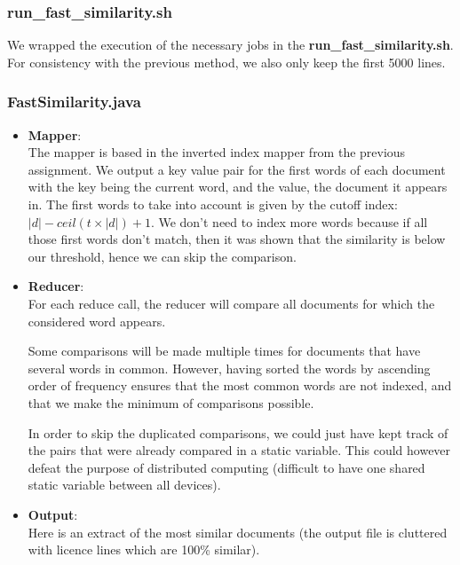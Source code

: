\documentclass[a4paper,10pt]{article}
\begin{document}
\subsubsection{run\_fast\_similarity.sh}
We wrapped the execution of the necessary jobs in the \textbf{run\_fast\_similarity.sh}.
For consistency with the previous method, we also only keep the first 5000 lines.


\subsubsection{FastSimilarity.java}
\begin{itemize}
  \item \textbf{Mapper}:\\
  The mapper is based in the inverted index mapper from the previous assignment.
  We output a key value pair for the first words of each document with the key being
  the current word, and the value, the document it appears in.
  The first words to take into account is given by the cutoff index: $|d| - ceil(t \times |d|) + 1$.
  We don't need to index more words because if all those first words don't match,
  then it was shown that the similarity is below our threshold, hence we can skip
  the comparison.
  

  \item \textbf{Reducer}:\\
  For each reduce call, the reducer will compare all documents for which the considered
  word appears.

  Some comparisons will be made multiple times for documents that have several words
  in common.
  However, having sorted the words by ascending order of frequency ensures that
  the most common words are not indexed, and that we make the minimum of comparisons possible.

  In order to skip the duplicated comparisons, we could just have kept track
  of the pairs that were already compared in a static variable.
  This could however defeat the purpose of distributed computing (difficult
  to have one shared static variable between all devices).
  

  \item \textbf{Output}:\\
  Here is an extract of the most similar documents (the output file is cluttered
  with licence lines which are 100\% similar).
  
\end{itemize}
\end{document}
